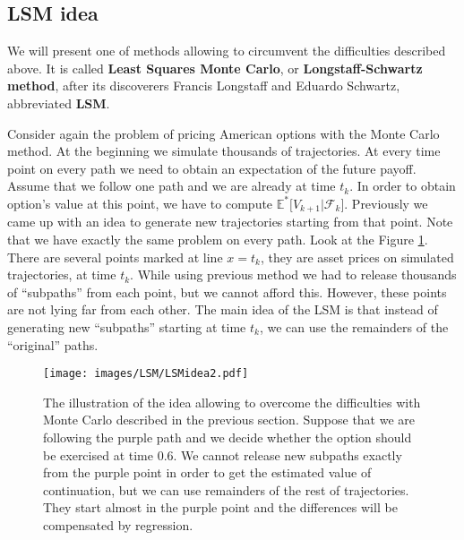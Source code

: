 \documentclass[a4paper,11pt, twoside]{book}
\theoremstyle{definition}
\theoremstyle{remark}
\def\Em{{\mathbb{E}^*}}
\begin{document}
\subsection{LSM idea}
We will present one of methods allowing to circumvent the difficulties described above. It is called \textbf{Least Squares Monte Carlo}, or \textbf{Longstaff-Schwartz method}, after its discoverers Francis Longstaff and Eduardo Schwartz, abbreviated \textbf{LSM}.

Consider again the problem of pricing American options with the Monte Carlo method. At the beginning we simulate thousands of trajectories. At every time point on every path we need to obtain an expectation of the future payoff. Assume that we follow one path and we are already at time $t_k$. In order to obtain option's value at this point, we have to compute $\Em\bigl[ V_{k+1} | \mathcal{F}_{k} \bigr]$. Previously we came up with an idea to generate new trajectories starting from that point.
Note that we have exactly the same problem on every path. Look at the Figure \ref{fig:LSMidea}. There are several points marked at line $x = t_k$, they are asset prices on simulated trajectories, at time $t_k$. While using previous method we had to release thousands of ``subpaths'' from each point, but we cannot afford this. However, these points are not lying far from each other. The main idea of the LSM is that instead of generating new ``subpaths'' starting at time $t_k$, we can use the remainders of the ``original'' paths.

\begin{figure}[!ht]
\centering
 \texttt{[image: images/LSM/LSMidea2.pdf]}
\caption{The illustration of the idea allowing to overcome the difficulties with Monte Carlo described in the previous section. Suppose that we are following the purple path and we decide whether the option should be exercised at time $0.6$. We cannot release new subpaths exactly from the purple point in order to get the estimated value of continuation, but we can use remainders of the rest of trajectories. They start almost in the purple point and the differences will be compensated by regression.}
\label{fig:LSMidea}
\end{figure}
\end{document}
